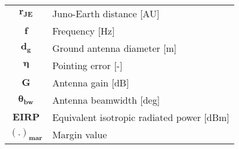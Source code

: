 \begin{multicols}{2}
{\begin{xltabular}{\linewidth}{c>{\raggedright\arraybackslash}X}
		$\boldsymbol{r_{JE}}$ & Juno-Earth distance [AU] \\
		$\boldsymbol{f}$ & Frequency [Hz] \\
		$\boldsymbol{d_g}$ & Ground antenna diameter [m] \\
		$\boldsymbol{\eta}$ & Pointing error [-] \\
		$\boldsymbol{G}$ & Antenna gain [dB] \\
		$\boldsymbol{\theta_{bw}}$ & Antenna beamwidth [deg] \\
		$\boldsymbol{EIRP}$ & Equivalent isotropic radiated power [dBm] \\
		$\boldsymbol{(.)_{mar}}$ & Margin value \\
		

 	\end{xltabular}
	\unskip
	\unpenalty
	\unpenalty}
	\unvbox\ltmcbox
\end{multicols}